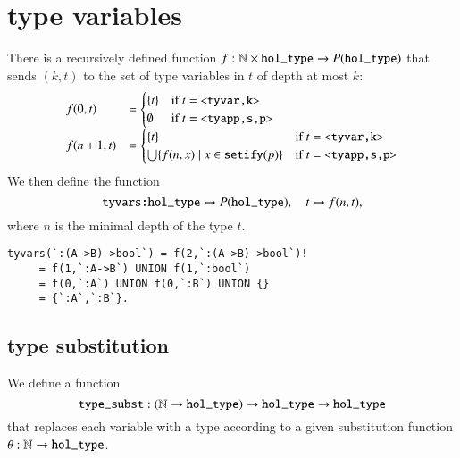\section{type variables}




There is a recursively defined function $f:\ring{N}\times \verb!hol_type!\to P(\verb!hol_type!)$ that sends $(k,t)$ to the set of type variables in $t$ of depth at most $k$:
$$
\begin{array}{lll}
f(0,t) &= \begin{cases} \{t\} &\hbox{if } t = \verb!<tyvar,k>!\\ \emptyset &\hbox{if } t = \verb!<tyapp,s,p>!\end{cases}\\
f(n+1,t) &= \begin{cases} \{t\} &\hbox{if } t= \verb!<tyvar,k>!\\ \bigcup\{ f(n,x) \mid x \in \verb!setify!(p) \} &\hbox{if } t = \verb!<tyapp,s,p>!\end{cases}\\
\end{array}
$$
We then define the function
$$
\verb!tyvars:hol_type!\mapsto P(\verb!hol_type!),\quad
t \mapsto f(n,t),
$$
where $n$ is the minimal depth of the type $t$.

\begin{example}
\begin{verbatim}
tyvars(`:(A->B)->bool`) = f(2,`:(A->B)->bool`)! 
     = f(1,`:A->B`) UNION f(1,`:bool`)
     = f(0,`:A`) UNION f(0,`:B`) UNION {}
     = {`:A`,`:B`}.
\end{verbatim}
\end{example}

\subsection{type substitution}

We define a function
$$
\verb!type_subst!:(\ring{N}\to \verb!hol_type!)\to \verb!hol_type! \to \verb!hol_type!
$$
that replaces each variable with a type according to a given substitution function $\theta:\ring{N}\to \verb!hol_type!$.

